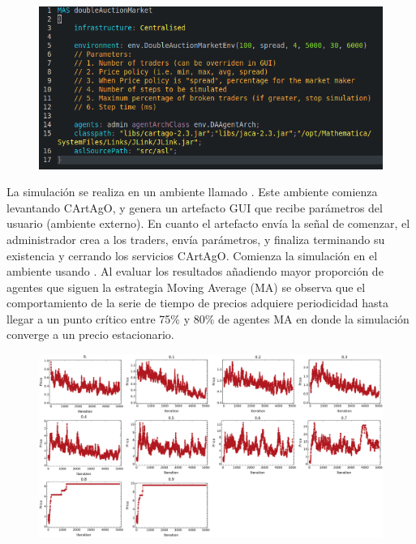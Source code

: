 \markdownRendererInterblockSeparator
{}\begin{figure}[h!] \centering \includegraphics[scale=0.3]{img/code.png} \end{figure}\markdownRendererInterblockSeparator
{}\markdownRendererUlBegin
\markdownRendererUlItem La simulación se realiza en un ambiente llamado .\markdownRendererUlItemEnd 
\markdownRendererUlItem Este ambiente comienza levantando CArtAgO, y genera un artefacto GUI que recibe parámetros del usuario (ambiente externo).\markdownRendererUlItemEnd 
\markdownRendererUlItem En cuanto el artefacto envía la señal de comenzar, el administrador crea a los traders, envía parámetros, y finaliza terminando su existencia y cerrando los servicios CArtAgO.\markdownRendererUlItemEnd 
\markdownRendererUlItem Comienza la simulación en el ambiente usando .\markdownRendererUlItemEnd 
\markdownRendererUlEnd \markdownRendererInterblockSeparator
{}\markdownRendererHorizontalRule{}\markdownRendererInterblockSeparator
{}\markdownRendererInterblockSeparator
{}Al evaluar los resultados añadiendo mayor proporción de agentes que siguen la estrategia Moving Average (MA) se observa que el comportamiento de la serie de tiempo de precios adquiere periodicidad hasta llegar a un punto crítico entre 75\% y 80\% de agentes MA en donde la simulación converge a un precio estacionario.\markdownRendererInterblockSeparator
{}\begin{figure}[h!] \centering \includegraphics[scale=0.25]{img/price_series.png} \end{figure}\markdownRendererInterblockSeparator
{}\markdownRendererHorizontalRule{}\relax